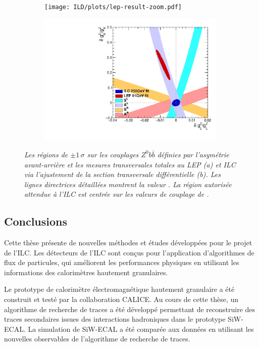 \begin{figure}
	\centering
	\begin{subfigure}{0.5\textwidth}
		\texttt{[image: ILD/plots/lep-result-zoom.pdf]}
		\caption{\label{fig:LEPILCResult_a_3F} }
	\end{subfigure}%
	\begin{subfigure}{0.5\textwidth}
		\centering
		\includegraphics[width=0.99\textwidth]{ILD/plots/ilc-result.pdf}
		\caption{\label{fig:LEPILCResult_b_3F} }
	\end{subfigure}
	\caption{\sl Les régions de $\pm 1\,\sigma$ sur les couplages $Z^0b\bar{b}$ définies par l'asymétrie avant-arrière et les mesures transversales totales au LEP (a) et ILC via l'ajustement de la section transversale différentielle (b). Les lignes directrices détaillées montrent la valeur \sm. La région autorisée attendue à l'ILC est centrée sur les valeurs de couplage de \sm.}
	\label{fig:LEPILCResult_3F}
\end{figure}

\subsection*{Conclusions}

Cette thèse présente de nouvelles méthodes et études développées pour le projet de l'ILC.
Les détecteurs de l'ILC sont conçus pour l'application d'algorithmes de flux de particules, qui améliorent les performances physiques en utilisant les informations des calorimètres hautement granulaires.

Le prototype de calorim\`etre \'electromagn\'etique hautement granulaire a été construit et testé par la collaboration CALICE.
Au cours de cette thèse, un algorithme de recherche de traces a été développé permettant de reconstruire des traces secondaires issues des interactions hadroniques dans le prototype SiW-ECAL.
La simulation de SiW-ECAL a été comparée aux données en utilisant les nouvelles observables de l'algorithme de recherche de traces.

